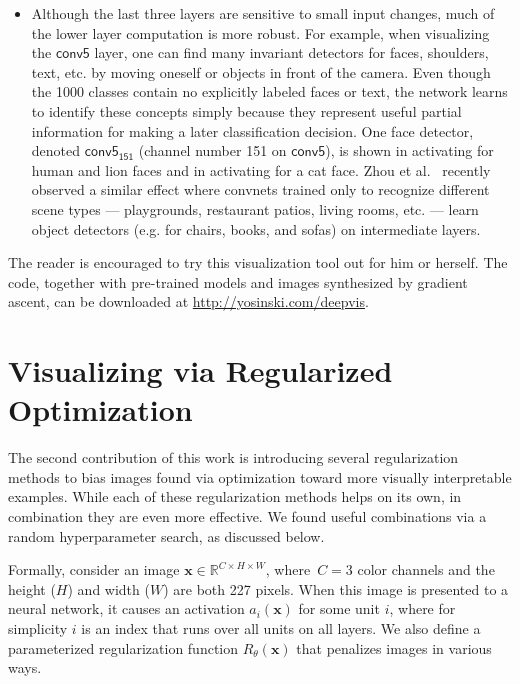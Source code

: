 \documentclass{article}
\newcommand{\x}{\mathbf{x}}
\newcommand{\layer}[1]{\ensuremath{\mathsf{#1}\xspace}}
\newcommand{\unit}[2]{\ensuremath{\mathsf{#1_{#2}}\xspace}}
\begin{document}
\begin{itemize}
\item Although the last three layers are sensitive to small input changes, much of the lower layer computation is more robust. For example, when visualizing the \layer{conv5} layer, one can find many invariant detectors for faces, shoulders, text, etc. by moving oneself or objects in front of the camera. Even though the 1000 classes contain no explicitly labeled faces or text, the network learns to identify these concepts simply because they represent useful partial information for making a later classification decision. One face detector, denoted \unit{conv5}{151} (channel number 151 on \layer{conv5}), is shown in  activating for human and lion faces and in  activating for a cat face. Zhou et al.~ recently observed a similar effect where convnets trained only to recognize different scene types --- playgrounds, restaurant patios, living rooms, etc. --- learn object detectors (e.g. for chairs, books, and sofas) on intermediate layers.

\end{itemize}

The reader is encouraged to try this visualization tool out for him or herself. The code, together with pre-trained models and images synthesized by gradient ascent, can be downloaded at
\url{http://yosinski.com/deepvis}.



\section{Visualizing via Regularized Optimization}



The second contribution of this work is introducing several regularization methods to bias images found via optimization toward more visually interpretable examples. While each of these regularization methods helps on its own, in combination they are even more effective. We found useful combinations via a random hyperparameter search, as discussed below.




Formally, consider an image $\x \in \mathbb{R} ^ {C \times H \times W}$, where\ $C = 3$ color channels and the height ($H$) and width ($W$) are both 227 pixels. When this image is presented to a neural network, it causes an activation $a_i(\x)$ for some unit $i$, where for simplicity $i$ is an index that runs over all units on all layers. We also define a parameterized regularization function $R_\theta(\x)$ that penalizes images in various ways.
\end{document}
